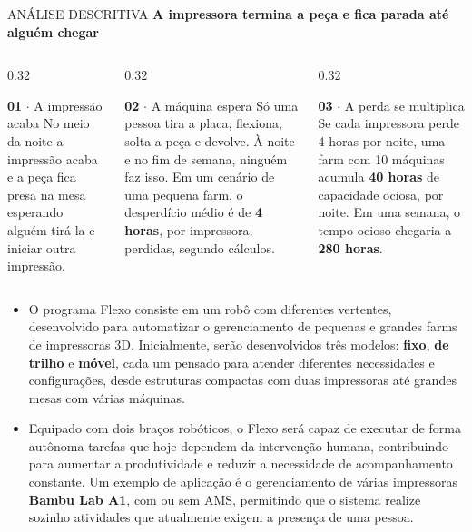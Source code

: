 \documentclass[aspectratio=169, 10pt]{beamer}
\newcommand{\currentpresenter}{Rodrigo}
\newcommand{\setpresenter}[1]{\renewcommand{\currentpresenter}{#1}}
\begin{document}
	\setpresenter{Rodrigo}
	\begin{frame}{ANÁLISE DESCRITIVA}
		\textbf{\large A impressora termina a peça e fica parada até alguém chegar}
		\vspace{0.2cm}
		
		\begin{columns}[T]
			\begin{column}{0.32\textwidth}
				\begin{block}{\textbf{01} $\cdot$ A impressão acaba}
					\scriptsize No meio da noite a impressão acaba e a peça fica presa na mesa esperando alguém tirá-la e iniciar outra impressão.
				\end{block}
			\end{column}
			\begin{column}{0.32\textwidth}
				\begin{block}{\textbf{02} $\cdot$ A máquina espera}
					\scriptsize Só uma pessoa tira a placa, flexiona, solta a peça e devolve. À noite e no fim de semana, ninguém faz isso. Em um cenário de uma pequena farm, o desperdício médio é de \textbf{4 horas}, por impressora, perdidas, segundo cálculos.
				\end{block}
			\end{column}
			\begin{column}{0.32\textwidth}
				\begin{block}{\textbf{03} $\cdot$ A perda se multiplica}
					\scriptsize Se cada impressora perde 4 horas por noite, uma farm com 10 máquinas acumula \textbf{40 horas} de capacidade ociosa, por noite. Em uma semana, o tempo ocioso chegaria a \textbf{280 horas}.
				\end{block}
			\end{column}
		\end{columns}
		
		\vspace{0.25cm}
		\scriptsize
		\begin{itemize}
			\item O programa Flexo consiste em um robô com diferentes vertentes, desenvolvido para automatizar o gerenciamento de pequenas e grandes farms de impressoras 3D. Inicialmente, serão desenvolvidos três modelos: \textbf{fixo}, \textbf{de trilho} e \textbf{móvel}, cada um pensado para atender diferentes necessidades e configurações, desde estruturas compactas com duas impressoras até grandes mesas com várias máquinas.
			\item Equipado com dois braços robóticos, o Flexo será capaz de executar de forma autônoma tarefas que hoje dependem da intervenção humana, contribuindo para aumentar a produtividade e reduzir a necessidade de acompanhamento constante. Um exemplo de aplicação é o gerenciamento de várias impressoras \textbf{Bambu Lab A1}, com ou sem AMS, permitindo que o sistema realize sozinho atividades que atualmente exigem a presença de uma pessoa.
		\end{itemize}
	\end{frame}
	
\end{document}
